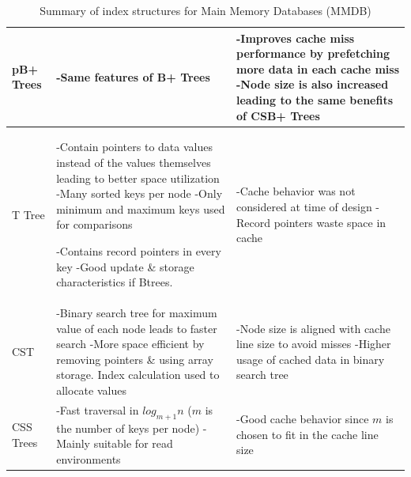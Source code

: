 \documentclass[12pt,a4paper]{article}
\begin{document}
\begin{table}[t!]
{\begin{tabular}{p{2.2cm}|p{6cm}|p{6cm}}
pB+ Trees & 
-Same features of B+ Trees
             &
-Improves cache miss performance by prefetching more data in each cache miss \linebreak \linebreak
-Node size is also increased leading to the same benefits of CSB+ Trees\\
\hline
T Tree &  
-Contain pointers to data values instead of the values themselves leading to better space utilization \linebreak \linebreak
-Many sorted keys per node \linebreak \linebreak
-Only minimum and maximum keys used for comparisons \linebreak \linebreak
\raggedright -Contains record pointers in every key \linebreak \linebreak
-Good update \& storage characteristics if Btrees.
             &
-Cache behavior was not considered at time of design \linebreak \linebreak
-Record pointers waste space in cache\\
\hline
CST & 
-Binary search tree for maximum value of each node leads to faster search \linebreak \linebreak
-More space efficient by removing pointers \& using array storage. Index calculation used to allocate values &
-Node size is aligned with cache line size to avoid misses \linebreak \linebreak
-Higher usage of cached data in binary search tree\\
\hline
CSS Trees & 
-Fast traversal in $log_{m+1}n$ ($m$ is the number of keys per node) \linebreak \linebreak
-Mainly suitable for read environments &
-Good cache behavior since $m$ is chosen to fit in the cache line size\\

\end{tabular}
}
\caption{Summary of index structures for Main Memory Databases (MMDB)}
\label{tab:mmdbindexsumm}
\end{table}
\end{document}
